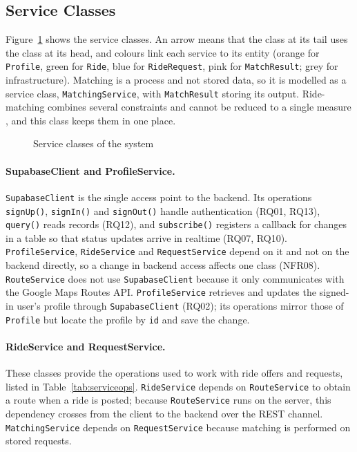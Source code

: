 {\subsection{Service Classes}
\label{sec:serviceclasses}

Figure~\ref{fig:service} shows the service classes. An arrow means that the class at its tail uses the class at its head, and colours link each service to its entity (orange for \texttt{Profile}, green for \texttt{Ride}, blue for \texttt{RideRequest}, pink for \texttt{MatchResult}; grey for infrastructure). Matching is a process and not stored data, so it is modelled as a service class, \texttt{MatchingService}, with \texttt{MatchResult} storing its output. Ride-matching combines several constraints and cannot be reduced to a single measure \citep{agatz2012,stiglic2016}, and this class keeps them in one place.

\begin{figure}[htbp]
  \centering
  \caption{Service classes of the system}
  \label{fig:service}
\end{figure}

\paragraph{SupabaseClient and ProfileService.} \texttt{SupabaseClient} is the single access point to the backend. Its operations \texttt{signUp()}, \texttt{signIn()} and \texttt{signOut()} handle authentication (RQ01, RQ13), \texttt{query()} reads records (RQ12), and \texttt{subscribe()} registers a callback for changes in a table so that status updates arrive in realtime (RQ07, RQ10). \texttt{ProfileService}, \texttt{RideService} and \texttt{RequestService} depend on it and not on the backend directly, so a change in backend access affects one class (NFR08). \texttt{RouteService} does not use \texttt{SupabaseClient} because it only communicates with the Google Maps Routes API. \texttt{ProfileService} retrieves and updates the signed-in user's profile through \texttt{SupabaseClient} (RQ02); its operations mirror those of \texttt{Profile} but locate the profile by \texttt{id} and save the change.

\paragraph{RideService and RequestService.} These classes provide the operations used to work with ride offers and requests, listed in Table~\ref{tab:serviceops}. \texttt{RideService} depends on \texttt{RouteService} to obtain a route when a ride is posted; because \texttt{RouteService} runs on the server, this dependency crosses from the client to the backend over the REST channel. \texttt{MatchingService} depends on \texttt{RequestService} because matching is performed on stored requests.

}
